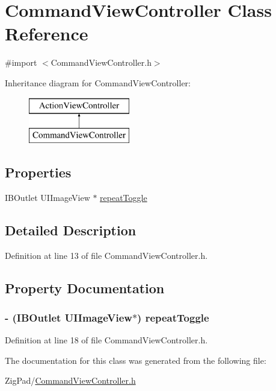 \hypertarget{interface_command_view_controller}{
\section{CommandViewController Class Reference}
\label{interface_command_view_controller}
}


{\ttfamily \#import $<$CommandViewController.h$>$}

Inheritance diagram for CommandViewController:\begin{figure}[H]
\begin{center}
\leavevmode
\includegraphics[height=2.000000cm]{interface_command_view_controller}
\end{center}
\end{figure}
\subsection*{Properties}
\begin{DoxyCompactItemize}
\item 
IBOutlet UIImageView $\ast$ \hyperlink{interface_command_view_controller_adb87f82a211c38323fee0a176378c464}{repeatToggle}
\end{DoxyCompactItemize}


\subsection{Detailed Description}


Definition at line 13 of file CommandViewController.h.



\subsection{Property Documentation}
\hypertarget{interface_command_view_controller_adb87f82a211c38323fee0a176378c464}{
\subsubsection[{repeatToggle}]{\setlength{\rightskip}{0pt plus 5cm}-\/ (IBOutlet UIImageView$\ast$) repeatToggle}}
\label{interface_command_view_controller_adb87f82a211c38323fee0a176378c464}


Definition at line 18 of file CommandViewController.h.



The documentation for this class was generated from the following file:\begin{DoxyCompactItemize}
\item 
ZigPad/\hyperlink{_command_view_controller_8h}{CommandViewController.h}\end{DoxyCompactItemize}
